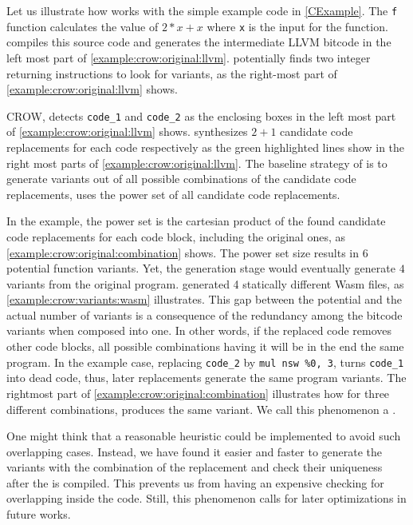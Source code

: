 Let us illustrate how works with the simple example code in \autoref{CExample}. The \texttt{f} function calculates the value of $2 * x + x$ where \texttt{x} is the input for the function.  compiles this source code and generates the intermediate LLVM bitcode in the left most part of \autoref{example:crow:original:llvm}. potentially finds two integer returning instructions to look for variants, as the right-most part of \autoref{example:crow:original:llvm} shows.


    

CROW, detects \texttt{code\_1} and \texttt{code\_2} as the enclosing boxes in the left most part of \autoref{example:crow:original:llvm} shows. synthesizes $2 + 1$ candidate code replacements for each code respectively as the green highlighted lines show in the right most parts of \autoref{example:crow:original:llvm}.
The baseline strategy of is to generate variants out of all possible combinations of the candidate code replacements, \ie uses the power set of all candidate code replacements.

In the example, the power set is the cartesian product of the found candidate code replacements for each code block, including the original ones, as \autoref{example:crow:original:combination} shows. The power set size results in $6$ potential function variants. Yet, the generation stage would eventually generate $4$ variants from the original program. generated 4 statically different Wasm files, as \autoref{example:crow:variants:wasm} illustrates. This gap between the potential and the actual number of variants is a consequence of the redundancy among the bitcode variants when composed into one. In other words, if the replaced code removes other code blocks, all possible combinations having it will be in the end the same program. In the example case, replacing \texttt{code\_2} by \texttt{mul nsw \%0, 3}, turns \texttt{code\_1} into dead code, thus, later replacements generate the same program variants. The rightmost part of \autoref{example:crow:original:combination} illustrates how for three different combinations, produces the same variant. We call this phenomenon a .



One might think that a reasonable heuristic could be implemented to avoid such overlapping cases. Instead, we have found it easier and faster to generate the variants with the combination of the replacement and check their uniqueness after the is compiled. This prevents us from having an expensive checking for overlapping inside the code. Still, this phenomenon calls for later optimizations in future works.


